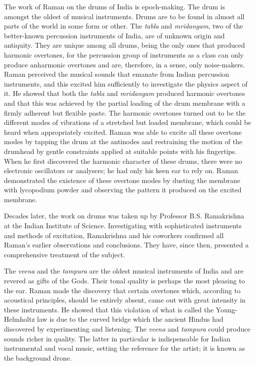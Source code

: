 \eject

The work of Raman on the drums of India is epoch-making. The drum is amongst the oldest of musical instruments. Drums are to be found in almost all parts of the world in some form or other. The {\em tabla} and {\em mridangam}, two of the better-known percussion instruments of India, are of unknown origin and antiquity. They are unique among all drums, being the only ones that produced harmonic overtones, for the percussion group of instruments as a class can only produce anharmonic overtones and are, therefore, in a sense, only noise-makers. Raman perceived the musical sounds that emanate from Indian percussion instruments, and this excited him sufficiently to investigate the physics aspect of it. He showed that both the {\em tabla} and {\em mridangam} produced harmonic overtones and that this was achieved by the partial loading of the drum membrane with a firmly adherent but flexible paste. The harmonic overtones turned out to be the different modes of vibrations of a stretched but loaded membrane, which could be heard when appropriately excited. Raman was able to excite all these overtone modes by tapping the drum at the antinodes and restraining the motion of the drumhead by gentle constraints applied at suitable points with his fingertips. When he first discovered the harmonic character of these drums, there were no electronic oscillators or analysers; he had only his keen ear to rely on. Raman demonstrated the existence of these overtone modes by dusting the membrane with lycopodium powder and observing the pattern it produced on the excited membrane.

Decades later, the work on drums was taken up by Professor B.S. Ramakrishna at the Indian Institute of Science. Investigating with sophisticated instruments and methods of excitation, Ramakrishna and his coworkers confirmed all Raman's earlier observations and conclusions. They have, since then, presented a comprehensive treatment of the subject.

The {\em veena} and the {\em tampura} are the oldest musical instruments of India and are revered as gifts of the Gods. Their tonal quality is perhaps the most pleasing to the ear. Raman made the discovery that certain overtones which, according to acoustical principles, should be entirely absent, came out with great intensity in these instruments. He showed that this violation of what is called the Young-Helmholtz law is due to the curved bridge which the ancient Hindus had discovered by experimenting and listening. The {\em veena} and {\em tampura} could produce sounds richer in quality. The latter in particular is indispensable for Indian instrumental and vocal music, setting the reference for the artist; it is known as the background drone.


